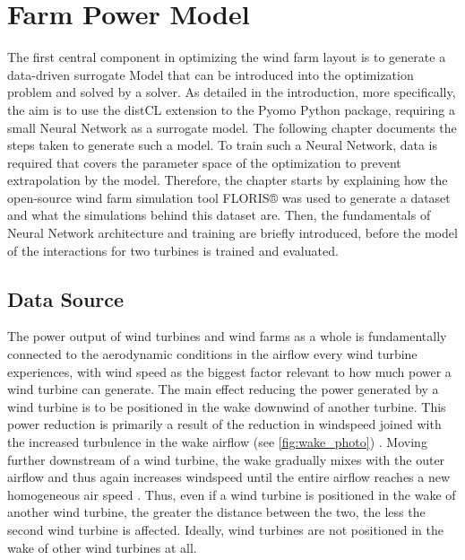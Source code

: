 \chapter{Farm Power Model}\label{chapter:power_model}

The first central component in optimizing the wind farm layout is to generate a data-driven surrogate Model that can be introduced into the optimization problem and solved by a solver. As detailed in the introduction, more specifically, the aim is to use the distCL extension to the Pyomo Python package, requiring a small Neural Network as a surrogate model. The following chapter documents the steps taken to generate such a model. To train such a Neural Network, data is required that covers the parameter space of the optimization to prevent extrapolation by the model. Therefore, the chapter starts by explaining how the open-source wind farm simulation tool FLORIS® was used to generate a dataset and what the simulations behind this dataset are. Then, the fundamentals of Neural Network architecture and training are briefly introduced, before the model of the interactions for two turbines is trained and evaluated.



\section{Data Source}

The power output of wind turbines and wind farms as a whole is fundamentally connected to the aerodynamic conditions in the airflow every wind turbine experiences, with wind speed as the biggest factor relevant to how much power a wind turbine can generate. The main effect reducing the power generated by a wind turbine is to be positioned in the wake downwind of another turbine. This power reduction is primarily a result of the reduction in windspeed joined with the increased turbulence in the wake airflow (see \ref{fig:wake_photo})  \cite{KIRANOUDIS1997439}. Moving further downstream of a wind turbine, the wake gradually mixes with the outer airflow and thus again increases windspeed until the entire airflow reaches a new homogeneous air speed \cite{MAGNUSSON1999169}. Thus, even if a wind turbine is positioned in the wake of another wind turbine, the greater the distance between the two, the less the second wind turbine is affected. Ideally, wind turbines are not positioned in the wake of other wind turbines at all. 

